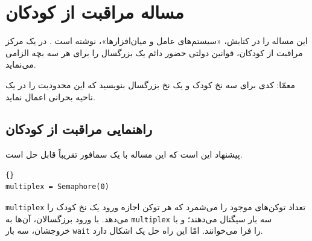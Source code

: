 \documentclass{book}
\newcommand{\clearemptydoublepage}{\newpage\cleardoublepage}
\begin{document}
\section{مساله مراقبت از کودکان}

    این مساله را  در کتابش، «سیستم‌های عامل و میان‌افزارها»، نوشته است \cite{hailperin}. 
    در یک مرکز مراقبت از کودکان، قوانین دولتی حضور دائم یک بزرگسال را برای هر سه بچه الزامی می‌نماید. 

    معمّا: کدی برای سه نخ کودک و یک نخ بزرگسال بنویسید که این محدودیت‌ را در یک ناحیه بحرانی اعمال نماید. 

\clearemptydoublepage
\subsection {راهنمایی مراقبت از کودکان}

    پیشنهاد  این است که این مساله با یک سمافور تقریباً قابل حل است. 

\begin{latin}
\begin{lstlisting}[title=\rl{راهنمایی مراقبت از کودکان}]{}
multiplex = Semaphore(0)
\end{lstlisting}
\end{latin}

    {\tt multiplex} 
    تعداد توکن‌های موجود را می‌شمرد که هر توکن اجازه ورود یک نخ کودک را می‌دهد. 
    با ورود برزگسالان، آن‌ها به {\tt multiplex} سه بار سیگنال می‌دهند؛ و با خروجشان، سه بار {\tt wait} را فرا می‌خوانند. 
    امّا این راه حل یک اشکال دارد. 
\end{document}
